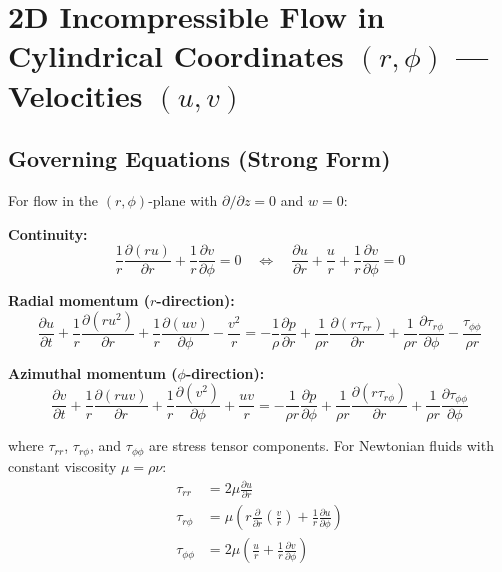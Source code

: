 
\section{2D Incompressible Flow in Cylindrical Coordinates $(r,\phi)$ --- Velocities $(u,v)$}
\label{sec:cyl_uv}

\subsection{Governing Equations (Strong Form)}

For flow in the $(r,\phi)$-plane with $\partial/\partial z = 0$ and $w = 0$:

\textbf{Continuity:}
\begin{equation}
    \frac{1}{r}\frac{\partial(ru)}{\partial r}
    +\frac{1}{r}\frac{\partial v}{\partial\phi} = 0
    \quad\Longleftrightarrow\quad
    \frac{\partial u}{\partial r}+\frac{u}{r}
    +\frac{1}{r}\frac{\partial v}{\partial\phi} = 0
    \label{eq:cyl_uv_cont}
\end{equation}

\textbf{Radial momentum ($r$-direction):}
\begin{equation}
    \frac{\partial u}{\partial t}
    + \frac{1}{r}\frac{\partial(ru^2)}{\partial r}
    + \frac{1}{r}\frac{\partial(uv)}{\partial\phi}
    - \frac{v^2}{r}
    = -\frac{1}{\rho}\frac{\partial p}{\partial r}
    + \frac{1}{\rho r}\frac{\partial(r\tau_{rr})}{\partial r}
    + \frac{1}{\rho r}\frac{\partial\tau_{r\phi}}{\partial\phi}
    - \frac{\tau_{\phi\phi}}{\rho r}
    \label{eq:cyl_uv_momr}
\end{equation}

\textbf{Azimuthal momentum ($\phi$-direction):}
\begin{equation}
    \frac{\partial v}{\partial t}
    + \frac{1}{r}\frac{\partial(ruv)}{\partial r}
    + \frac{1}{r}\frac{\partial(v^2)}{\partial\phi}
    + \frac{uv}{r}
    = -\frac{1}{\rho r}\frac{\partial p}{\partial\phi}
    + \frac{1}{\rho r}\frac{\partial(r\tau_{r\phi})}{\partial r}
    + \frac{1}{\rho r}\frac{\partial\tau_{\phi\phi}}{\partial\phi}
    \label{eq:cyl_uv_momv}
\end{equation}

where $\tau_{rr}$, $\tau_{r\phi}$, and $\tau_{\phi\phi}$ are stress tensor components. For Newtonian fluids with constant viscosity $\mu = \rho\nu$:
\begin{align}
    \tau_{rr} &= 2\mu\frac{\partial u}{\partial r}
    \\
    \tau_{r\phi} &= \mu\!\left(r\frac{\partial}{\partial r}\left(\frac{v}{r}\right)+\frac{1}{r}\frac{\partial u}{\partial\phi}\right)
    \\
    \tau_{\phi\phi} &= 2\mu\left(\frac{u}{r}+\frac{1}{r}\frac{\partial v}{\partial\phi}\right)
\end{align}

